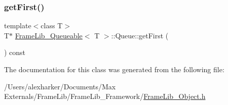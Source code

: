 \mbox{\label{class_frame_lib___queueable_1_1_queue_a57e16be316a37b9b6d0d5cf7267e4d12}} 
\subsubsection{\texorpdfstring{get\+First()}{getFirst()}}
{\footnotesize\ttfamily template$<$class T$>$ \\
T$\ast$ \hyperlink{class_frame_lib___queueable}{Frame\+Lib\+\_\+\+Queueable}$<$ T $>$\+::Queue\+::get\+First (\begin{DoxyParamCaption}{ }\end{DoxyParamCaption}) const\hspace{0.3cm}{\ttfamily [inline]}}



The documentation for this class was generated from the following file\+:\begin{DoxyCompactItemize}
\item 
/\+Users/alexharker/\+Documents/\+Max Externals/\+Frame\+Lib/\+Frame\+Lib\+\_\+\+Framework/\hyperlink{_frame_lib___object_8h}{Frame\+Lib\+\_\+\+Object.\+h}\end{DoxyCompactItemize}
